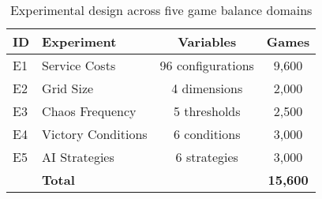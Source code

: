 \begin{table}[h]
\centering
\caption{Experimental design across five game balance domains}
\label{tab:experiments}
\begin{tabular}{@{}llcc@{}}
\toprule
ID & Experiment & Variables & Games \\
\midrule
E1 & Service Costs & 96 configurations & 9,600 \\
E2 & Grid Size & 4 dimensions & 2,000 \\
E3 & Chaos Frequency & 5 thresholds & 2,500 \\
E4 & Victory Conditions & 6 conditions & 3,000 \\
E5 & AI Strategies & 6 strategies & 3,000 \\
\midrule
& \textbf{Total} & & \textbf{15,600} \\
\bottomrule
\end{tabular}
\end{table}